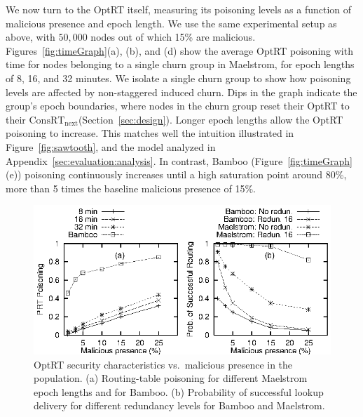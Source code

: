 \documentclass[10pt,twocolumn]{article}
\newcommand{\PRT}{OptRT\xspace}
\newcommand{\CRT}{ConsRT\xspace}
\newcommand{\CRTNext}{$\mathrm{\CRT}_{\mbox{next}}$\xspace}
\begin{document}
We now turn to the \PRT itself, measuring its poisoning levels as a
function of malicious presence and epoch length. We use the same
experimental setup as above, with $50,000$ nodes out of which 15\% are
malicious. Figures~\ref{fig:timeGraph}(a), (b), and (d) show the
average \PRT
poisoning with time for nodes belonging to a single churn group in
Maelstrom, for epoch lengths of 8, 16, and 32 minutes.  We isolate a
single churn group to show how poisoning levels are affected by non-staggered
induced churn.
Dips in the graph indicate
the group's epoch boundaries, where nodes in the churn group reset their \PRT to their
\CRTNext (Section~\ref{sec:design}).  Longer epoch lengths allow the \PRT poisoning to increase.  This matches well
the intuition illustrated in Figure~\ref{fig:sawtooth}, and the model
analyzed in Appendix~\ref{sec:evaluation:analysis}.
In contrast, Bamboo (Figure~\ref{fig:timeGraph}(e)) poisoning 
continuously increases until a high saturation point around 80\%, more
than 5 times the baseline malicious presence of 15\%. 

\begin{figure}
\centerline{\includegraphics{graphs/prtPoisoning}}
\caption{\PRT security characteristics vs.\ malicious presence in the
  population. (a) Routing-table poisoning for different Maelstrom epoch lengths and for Bamboo.
  (b) Probability of successful lookup delivery for different redundancy
  levels for Bamboo and Maelstrom.}
\label{fig:prtPoisoning}
\end{figure}
\end{document}
